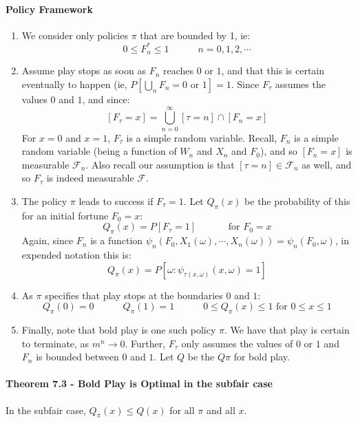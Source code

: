\documentclass[12pt,a4paper]{article}
\newcommand{\1}[1]{\mathbbm{1}\left\{ #1 \right\}}
\newcommand{\fcal}{\mathcal{F}}
\begin{document}
\paragraph{Policy Framework}
\begin{enumerate}
	\item We consider only policies $\pi$ that are bounded by 1, ie:
	$$
		0 \leq F_n^* \leq 1 \quad\quad\quad n = 0, 1, 2, \cdots
	$$
	
	\item Assume play stops as soon as $F_n$ reaches $0$ or $1$, and that this is certain eventually to happen (ie, $P\left[\bigcup_n F_n = 0 \text{ or } 1\right] = 1$. Since $F_\tau$ assumes the values $0$ and $1$, and since:
	$$
		\left[F_\tau = x\right] = \bigcup_{n=0}^\infty [\tau = n] \cap [F_n = x]
	$$
	For $x = 0$ and $x = 1$, $F_\tau$ is a simple random variable. Recall, $F_n$ is a simple random variable (being a function of $W_n$ and $X_n$ and $F_0$), and so $[F_n = x]$ is measurable $\fcal_n$. Also recall our assumption is that $[\tau = n] \in \fcal_n$ as well, and so $F_\tau$ is indeed measurable $\fcal$.
	
	\item The policy $\pi$ leads to success if $F_\tau = 1$. Let $Q_\pi(x)$ be the probability of this for an initial fortune $F_0 = x$:
	$$
		Q_\pi(x) = P[F_\tau = 1] \quad\quad\quad \text{ for $F_0 = x$}
	$$
	Again, since $F_n$ is a function $\psi_n(F_0, X_1(\omega), \cdots, X_n(\omega)) = \psi_n(F_0, \omega)$, in expended notation this is:
	$$
		Q_\pi(x) = P\left[\omega : \psi_{\tau(x,\omega)}(x, \omega) = 1\right]
	$$
	
	\item As $\pi$ specifies that play stops at the boundaries $0$ and $1$:
	$$
		Q_\pi(0) = 0 \quad\quad\quad
		Q_\pi(1) = 1 \quad\quad\quad
		0 \leq Q_\pi(x) \leq 1 \text{ for $0 \leq x \leq 1$}
	$$
	
	\item Finally, note that bold play is one such policy $\pi$. We have that play is certain to terminate, as $m^n \to 0$. Further, $F_\tau$ only assumes the values of $0$ or $1$ and $F_n$ is bounded between $0$ and $1$. Let $Q$ be the $Q\pi$ for bold play.
\end{enumerate}


\paragraph{Theorem 7.3 - Bold Play is Optimal in the subfair case} In the subfair case, $Q_\pi(x) \leq Q(x)$ for all $\pi$ and all $x$.
\end{document}
